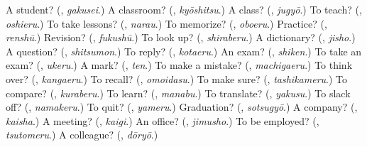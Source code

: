 \begin{tcolorbox}[breakable,colback=teal!4,colframe=teal!35!black,title={Before you move on}]
A student? (\textbf{}, \emph{gakusei}.) A classroom? (\textbf{}, \emph{kyōshitsu}.) A class? (\textbf{}, \emph{jugyō}.) To teach? (\textbf{}, \emph{oshieru}.) To take lessons? (\textbf{}, \emph{narau}.) To memorize? (\textbf{}, \emph{oboeru}.) Practice? (\textbf{}, \emph{renshū}.) Revision? (\textbf{}, \emph{fukushū}.) To look up? (\textbf{}, \emph{shiraberu}.) A dictionary? (\textbf{}, \emph{jisho}.) A question? (\textbf{}, \emph{shitsumon}.) To reply? (\textbf{}, \emph{kotaeru}.) An exam? (\textbf{}, \emph{shiken}.) To take an exam? (\textbf{}, \emph{ukeru}.) A mark? (\textbf{}, \emph{ten}.) To make a mistake? (\textbf{}, \emph{machigaeru}.) To think over? (\textbf{}, \emph{kangaeru}.) To recall? (\textbf{}, \emph{omoidasu}.) To make sure? (\textbf{}, \emph{tashikameru}.) To compare? (\textbf{}, \emph{kuraberu}.) To learn? (\textbf{}, \emph{manabu}.) To translate? (\textbf{}, \emph{yakusu}.) To slack off? (\textbf{}, \emph{namakeru}.) To quit? (\textbf{}, \emph{yameru}.) Graduation? (\textbf{}, \emph{sotsugyō}.) A company? (\textbf{}, \emph{kaisha}.) A meeting? (\textbf{}, \emph{kaigi}.) An office? (\textbf{}, \emph{jimusho}.) To be employed? (\textbf{}, \emph{tsutomeru}.) A colleague? (\textbf{}, \emph{dōryō}.)
\end{tcolorbox}
